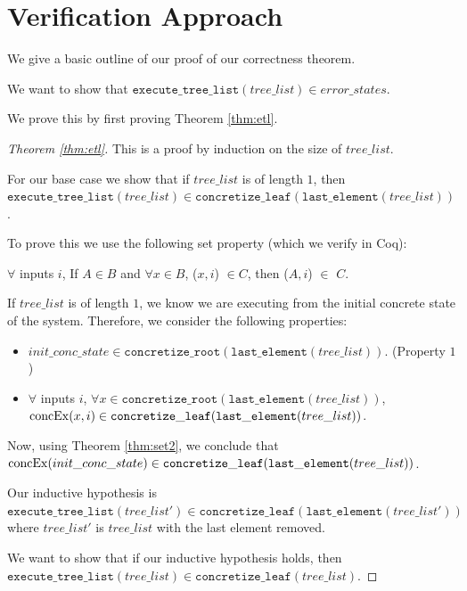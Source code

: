 \section{Verification Approach}
We give a basic outline of our proof of our correctness theorem.

We want to show that $\mathtt{execute\_tree\_list} (tree\_list) \in error\_states$.

We prove this by first proving Theorem \ref{thm:etl}.

\begin{proof}[Theorem \ref{thm:etl}]
This is a proof by induction on the size of $tree\_list$.

For our base case we show that if $tree\_list$ is of length $1$, then $\mathtt{execute\_tree\_list} (tree\_list) \in \mathtt{concretize\_leaf} (\mathtt{last\_element} (tree\_list))$.


To prove this we use the following set property (which we verify in Coq):

\begin{theorem}
$\forall$ inputs $i$,
If $A \in B$ and 
$\forall x \in B$, \concexecution($x, i$) $\in C$, then  \concexecution($A, i$) $\in$ $C$.
\label{thm:set2}
\end{theorem}

If $tree\_list$ is of length $1$, we know we are executing from the initial concrete state of the system. Therefore, we consider the following properties:
\begin{itemize}
\item $init\_conc\_state \in 
  \mathtt{concretize\_root} (\mathtt{last\_element} (tree\_list))$. (Property $1$)
 \item $ \forall$ inputs $i$, 
 $\forall x \in
  \mathtt{concretize\_root} (\mathtt{last\_element} (tree\_list))$,  \\
 $ \mathrm{concEx}(x, i) \in \mathtt{concretize\_leaf}(\mathtt{last\_element}(tree\_list))$.
\end{itemize}

Now, using Theorem \ref{thm:set2}, we conclude that $\mathrm{concEx}(init\_conc\_state) \in \mathtt{concretize\_leaf}(\mathtt{last\_element}(tree\_list))$.

Our inductive hypothesis is  $\mathtt{execute\_tree\_list} (tree\_list') \in \mathtt{concretize\_leaf} (\mathtt{last\_element}(tree\_list'))$ where $tree\_list'$ is $tree\_list$ with the last element removed.

We want to show that if our inductive hypothesis holds, then $\mathtt{execute\_tree\_list} (tree\_list) \in \mathtt{concretize\_leaf}(tree\_list)$.


\end{proof}
